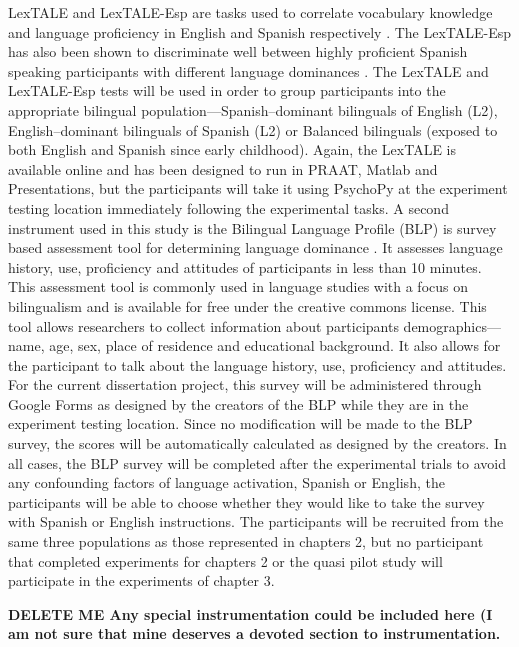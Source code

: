 LexTALE and LexTALE-Esp are tasks used to correlate vocabulary knowledge and language proficiency in English and Spanish respectively \citep{Izura2014-yw, Lemhofer2012-hz}. The LexTALE-Esp has also been shown to discriminate well between highly proficient Spanish speaking participants with different language dominances \citep{Ferre2017-lp}. The LexTALE and LexTALE-Esp tests will be used in order to group participants into the appropriate bilingual population—Spanish–dominant bilinguals of English (L2), English–dominant bilinguals of Spanish (L2) or Balanced bilinguals (exposed to both English and Spanish since early childhood). Again, the LexTALE is available online and has been designed to run in PRAAT, Matlab and Presentations, but the participants will take it using PsychoPy at the experiment testing location immediately following the experimental tasks. 
A second instrument used in this study is the Bilingual Language Profile (BLP) is survey based assessment tool for determining language dominance \citep{Birdsong2012-wd}. It assesses language history, use, proficiency and attitudes of participants in less than 10 minutes. This assessment tool is commonly used in language studies with a focus on bilingualism and is available for free under the creative commons license. This tool allows researchers to collect information about participants demographics—name, age, sex, place of residence and educational background. It also allows for the participant to talk about the language history, use, proficiency and attitudes. For the current dissertation project, this survey will be administered through Google Forms as designed by the creators of the BLP while they are in the experiment testing location. Since no modification will be made to the BLP survey, the scores will be automatically calculated as designed by the creators. In all cases, the BLP survey will be completed after the experimental trials to avoid any confounding factors of language activation, Spanish or English, the participants will be able to choose whether they would like to take the survey with Spanish or English instructions. The participants will be recruited from the same three populations as those represented in chapters 2, but no participant that completed experiments for chapters 2 or the quasi pilot study will participate in the experiments of chapter 3.

\textbf{DELETE ME Any special instrumentation could be included here (I am not sure that mine deserves a devoted section to instrumentation.}



